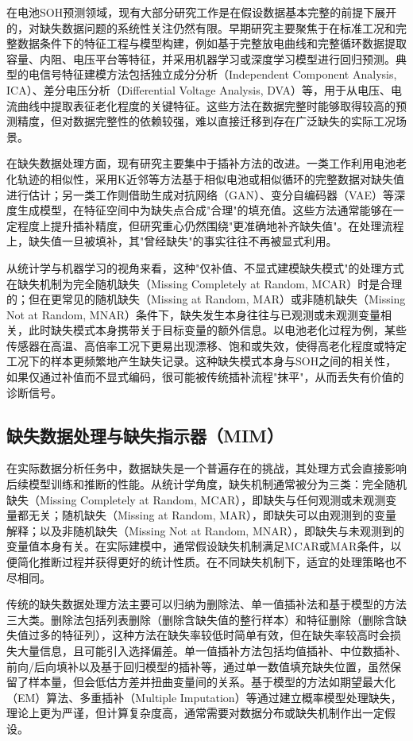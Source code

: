 \documentclass[10pt,a4paper]{ctexart}
\begin{document}
在电池SOH预测领域，现有大部分研究工作是在假设数据基本完整的前提下展开的，对缺失数据问题的系统性关注仍然有限\cite{shao2025soh}。早期研究主要聚焦于在标准工况和完整数据条件下的特征工程与模型构建，例如基于完整放电曲线和完整循环数据提取容量、内阻、电压平台等特征，并采用机器学习或深度学习模型进行回归预测。典型的电信号特征建模方法包括独立成分分析（Independent Component Analysis, ICA）、差分电压分析（Differential Voltage Analysis, DVA）等，用于从电压、电流曲线中提取表征老化程度的关键特征\cite{deng2025novel}。这些方法在数据完整时能够取得较高的预测精度，但对数据完整性的依赖较强，难以直接迁移到存在广泛缺失的实际工况场景。

在缺失数据处理方面，现有研究主要集中于插补方法的改进。一类工作利用电池老化轨迹的相似性，采用K近邻等方法基于相似电池或相似循环的完整数据对缺失值进行估计；另一类工作则借助生成对抗网络（GAN）、变分自编码器（VAE）等深度生成模型，在特征空间中为缺失点合成"合理"的填充值。这些方法通常能够在一定程度上提升插补精度，但研究重心仍然围绕"更准确地补齐缺失值"。在处理流程上，缺失值一旦被填补，其"曾经缺失"的事实往往不再被显式利用。

从统计学与机器学习的视角来看，这种"仅补值、不显式建模缺失模式"的处理方式在缺失机制为完全随机缺失（Missing Completely at Random, MCAR）时是合理的；但在更常见的随机缺失（Missing at Random, MAR）或非随机缺失（Missing Not at Random, MNAR）条件下，缺失发生本身往往与已观测或未观测变量相关，此时缺失模式本身携带关于目标变量的额外信息。以电池老化过程为例，某些传感器在高温、高倍率工况下更易出现漂移、饱和或失效，使得高老化程度或特定工况下的样本更频繁地产生缺失记录。这种缺失模式本身与SOH之间的相关性，如果仅通过补值而不显式编码，很可能被传统插补流程"抹平"，从而丢失有价值的诊断信号。

\subsection{缺失数据处理与缺失指示器（MIM）}

在实际数据分析任务中，数据缺失是一个普遍存在的挑战，其处理方式会直接影响后续模型训练和推断的性能。从统计学角度，缺失机制通常被分为三类：完全随机缺失（Missing Completely at Random, MCAR），即缺失与任何观测或未观测变量都无关；随机缺失（Missing at Random, MAR），即缺失可以由观测到的变量解释；以及非随机缺失（Missing Not at Random, MNAR），即缺失与未观测到的变量值本身有关\cite{little2002statistical}。在实际建模中，通常假设缺失机制满足MCAR或MAR条件，以便简化推断过程并获得更好的统计性质\cite{little2002statistical}。在不同缺失机制下，适宜的处理策略也不尽相同。

传统的缺失数据处理方法主要可以归纳为删除法、单一值插补法和基于模型的方法三大类。删除法包括列表删除（删除含缺失值的整行样本）和特征删除（删除含缺失值过多的特征列），这种方法在缺失率较低时简单有效，但在缺失率较高时会损失大量信息，且可能引入选择偏差。单一值插补方法包括均值插补、中位数插补、前向/后向填补以及基于回归模型的插补等，通过单一数值填充缺失位置，虽然保留了样本量，但会低估方差并扭曲变量间的关系。基于模型的方法如期望最大化（EM）算法、多重插补（Multiple Imputation）等通过建立概率模型处理缺失，理论上更为严谨，但计算复杂度高，通常需要对数据分布或缺失机制作出一定假设。
\end{document}
